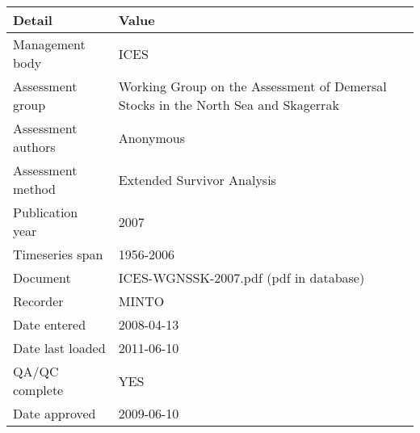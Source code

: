 \begin{table}[htb]
\centering
\begin{tabular}{lp{7cm}}
\toprule
Detail & Value \\
\midrule
Management body    & ICES                                                                              \\
Assessment group   & Working Group on the Assessment of Demersal Stocks in the North Sea and Skagerrak \\
Assessment authors & Anonymous                                                                         \\
Assessment method  & Extended Survivor Analysis                                                        \\
Publication year   & 2007                                                                              \\
Timeseries span    & 1956-2006                                                                         \\
Document           & ICES-WGNSSK-2007.pdf (pdf in database)                                            \\
Recorder           & MINTO                                                                             \\
Date entered       & 2008-04-13                                                                        \\
Date last loaded   & 2011-06-10                                                                        \\
QA/QC complete     & YES                                                                               \\
Date approved      & 2009-06-10                                                                        \\
\bottomrule
\end{tabular}
\label{tab:assessdet}
\end{table}
